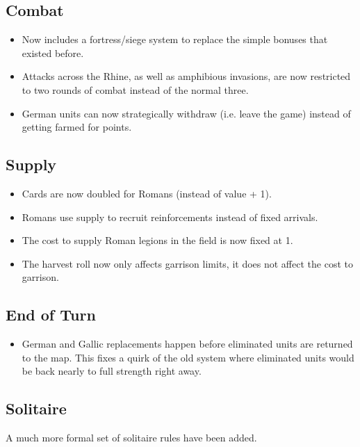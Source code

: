 \subsection{Combat}
\begin{itemize}
  \item Now includes a fortress/siege system to replace the simple bonuses that existed before.
  \item Attacks across the Rhine, as well as amphibious invasions, are now restricted to two rounds of combat instead of the normal three.
  \item German units can now strategically withdraw (i.e. leave the game) instead of getting farmed for points.
\end{itemize}
  
\subsection{Supply}
\begin{itemize}
  \item Cards are now doubled for Romans (instead of value + 1).
  \item Romans use supply to recruit reinforcements instead of fixed arrivals.
  \item The cost to supply Roman legions in the field is now fixed at 1.
  \item The harvest roll now only affects garrison limits, it does not affect the cost to garrison.
\end{itemize}
  
\subsection{End of Turn}
\begin{itemize}
	\item German and Gallic replacements happen before eliminated units are returned to the map. This fixes a quirk of the old system where eliminated units would be back nearly to full strength right away.
\end{itemize}
  
\subsection{Solitaire}

A much more formal set of solitaire rules have been added.